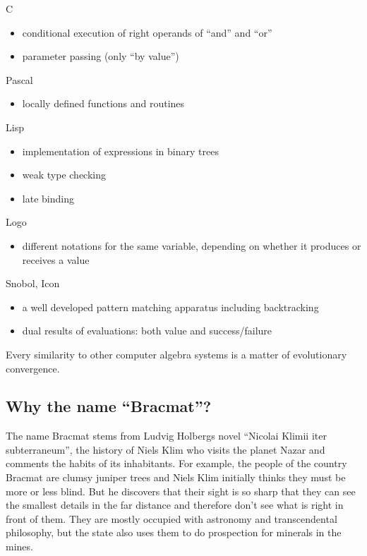 \documentclass[12pt]{article}
\begin{document}
\begin{description}
\item C
  \begin{itemize}
  \item conditional execution of right operands of ``and'' and ``or''
  \item parameter passing (only ``by value'')
  \end{itemize}
  
\item Pascal
  \begin{itemize}
  \item locally defined functions and routines
  \end{itemize}

\item Lisp
  \begin{itemize}
  \item implementation of expressions in binary trees
  \item weak type checking
  \item late binding
  \end{itemize}
  
\item Logo
  \begin{itemize}
  \item different notations for the same variable, depending on whether
    it produces or receives a value
  \end{itemize}
  
\item Snobol, Icon
  \begin{itemize}
  \item a well developed pattern matching apparatus including
    backtracking
  \item dual results of evaluations: both value and success/failure
  \end{itemize}
\end{description}

Every similarity to other computer algebra systems is a matter of
evolutionary convergence.

\subsection{Why the name ``Bracmat''?}

The name Bracmat stems from Ludvig Holbergs novel ``Nicolai Klimii iter
subterraneum'', the history of Niels Klim who visits the planet Nazar
and comments the habits of its inhabitants. For example, the people of
the country Bracmat are clumsy juniper trees and Niels Klim initially
thinks they must be more or less blind. But he discovers that their
sight is so sharp that they can see the smallest details in the far
distance and therefore don't see what is right in front of them. They
are mostly occupied with astronomy and transcendental philosophy, but
the state also uses them to do prospection for minerals in the mines.
\end{document}
